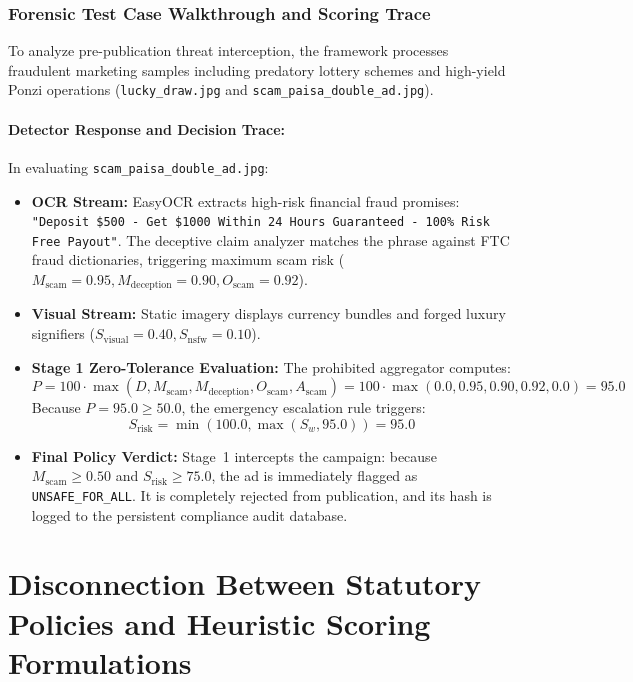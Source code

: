 \documentclass[12pt,a4paper]{report}
\begin{document}
\subsubsection{Forensic Test Case Walkthrough and Scoring Trace}
To analyze pre-publication threat interception, the framework processes fraudulent marketing samples including predatory lottery schemes and high-yield Ponzi operations (\texttt{lucky\_draw.jpg} and \texttt{scam\_paisa\_double\_ad.jpg}).

\paragraph{Detector Response and Decision Trace:}
In evaluating \texttt{scam\_paisa\_double\_ad.jpg}:
\begin{itemize}
    \item \textbf{OCR Stream:} EasyOCR extracts high-risk financial fraud promises: \texttt{"Deposit \$500 - Get \$1000 Within 24 Hours Guaranteed - 100\% Risk Free Payout"}. The deceptive claim analyzer matches the phrase against FTC fraud dictionaries, triggering maximum scam risk ($M_{\text{scam}} = 0.95, M_{\text{deception}} = 0.90, O_{\text{scam}} = 0.92$).
    \item \textbf{Visual Stream:} Static imagery displays currency bundles and forged luxury signifiers ($S_{\text{visual}} = 0.40, S_{\text{nsfw}} = 0.10$).
    \item \textbf{Stage 1 Zero-Tolerance Evaluation:}
    The prohibited aggregator computes:
    \begin{equation}
    P = 100 \cdot \max(D, M_{\text{scam}}, M_{\text{deception}}, O_{\text{scam}}, A_{\text{scam}}) = 100 \cdot \max(0.0, 0.95, 0.90, 0.92, 0.0) = 95.0
    \end{equation}
    Because $P = 95.0 \ge 50.0$, the emergency escalation rule triggers:
    \begin{equation}
    S_{\text{risk}} = \min(100.0, \max(S_w, 95.0)) = 95.0
    \end{equation}
    \item \textbf{Final Policy Verdict:} Stage~1 intercepts the campaign: because $M_{\text{scam}} \ge 0.50$ and $S_{\text{risk}} \ge 75.0$, the ad is immediately flagged as \texttt{UNSAFE\_FOR\_ALL}. It is completely rejected from publication, and its hash is logged to the persistent compliance audit database.
\end{itemize}

\section{Disconnection Between Statutory Policies and Heuristic Scoring Formulations}
\end{document}
